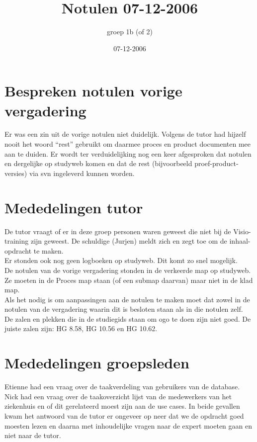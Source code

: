 \documentclass[]{article}
\title{Notulen 07-12-2006}
\author{groep 1b (of 2) }
\date{07-12-2006}
\begin{document}
\maketitle
\section{Bespreken notulen vorige vergadering}
Er was een zin uit de vorige notulen niet duidelijk. Volgens de tutor had
hijzelf nooit het woord ``rest'' gebruikt om daarmee proces en product documenten
mee aan te duiden. Er wordt ter verduidelijking nog een keer afgesproken dat
notulen en dergelijke op studyweb komen en dat de rest (bijvoorbeeld
proef-product-versies) via svn ingeleverd kunnen worden.

\section{Mededelingen tutor}
De tutor vraagt of er in deze groep personen waren geweest die niet bij de
Visio-training zijn geweest. De schuldige (Jurjen) meldt zich en zegt toe om de
inhaal-opdracht te maken.\\
Er stonden ook nog geen logboeken op studyweb. Dit komt zo snel mogelijk.\\
De notulen van de vorige vergadering stonden in de verkeerde map op studyweb. Ze
moeten in de Proces map staan (of een submap daarvan) maar niet in de klad
map.\\
Als het nodig is om aanpassingen aan de notulen te maken moet dat zowel in de
notulen van de vergadering waarin dit is besloten staan als in die notulen
zelf.\\
De zalen en plekken die in de studiegids staan om ogo te doen zijn niet goed. De
juiste zalen zijn: HG 8.58, HG 10.56 en HG 10.62.\\


\section{Mededelingen groepsleden}
Etienne had een vraag over de taakverdeling van gebruikers van de
database. Nick had een vraag over de taakoverzicht lijst van de
medewerkers van het ziekenhuis en of dit gerelateerd moest zijn aan
de use cases. In beide gevallen kwam het antwoord van de tutor er
ongeveer op neer dat we de opdracht goed moesten lezen en daarna
met inhoudelijke vragen naar de expert moeten gaan en niet naar de
tutor.\\
\end{document}
